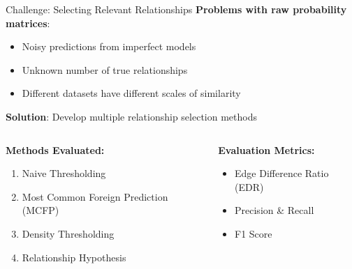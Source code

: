 \documentclass[aspectratio=169]{beamer}
\begin{document}
\begin{frame}{Challenge: Selecting Relevant Relationships}
    \textbf{Problems with raw probability matrices}:
    \begin{itemize}
        \item Noisy predictions from imperfect models
        \item Unknown number of true relationships
        \item Different datasets have different scales of similarity
    \end{itemize}

    \vspace{1em}

    \textbf{Solution}: Develop multiple relationship selection methods

    \vspace{1em}

    \begin{columns}[T]
        \begin{column}{0.48\textwidth}
            \textbf{Methods Evaluated:}
            \begin{enumerate}
                \item Naive Thresholding
                \item Most Common Foreign Prediction (MCFP)
                \item Density Thresholding
                \item Relationship Hypothesis
            \end{enumerate}
        \end{column}

        \begin{column}{0.48\textwidth}
            \textbf{Evaluation Metrics:}
            \begin{itemize}
                \item Edge Difference Ratio (EDR)
                \item Precision \& Recall
                \item F1 Score
            \end{itemize}
        \end{column}
    \end{columns}
\end{frame}
\end{document}

